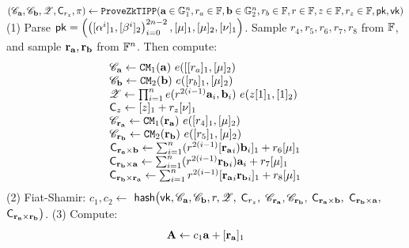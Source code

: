 \def\hp{\hspace*{0.1in}}
\begin{small}
\begin{algorithm}[bt]
$ (\GCommit_\myvec{a}, \GCommit_\myvec{b}, \Z, \Commit_{r_z}, \prf) 
	\leftarrow \newline
	\zktippprove(\myvec{a} \in \G_1^n, r_a \in \F, \myvec{b} \in \G_2^n, 
		r_b \in \F, r \in \F, z \in \F, r_z \in \F, \pk, \vk)$
\newline
(1) Parse $\mathsf{pk} = \left(\left([\alpha^i]_1, [\beta^i]_2\right)_{i=0}^{2n-2},
	[\mu]_1, [\mu]_2, [\nu]_1\right)$. 
Sample $r_4, r_5, r_6, r_7, r_8$ from $\mathbb{F}$, 
and sample ${{\mathbf {r_a}}}, {{\mathbf {r_b}}}$ from $\mathbb{F}^n$. Then compute:
\[
\begin{array} {l}
\GCommit_\myvec{a} \leftarrow \gcm_1(\myvec{a})~ e([[r_a]_1, [\mu]_2) \\
\GCommit_\myvec{b} \leftarrow \gcm_2(\myvec{b})~ e([r_b]_1, [\mu]_2) \\
\Z \leftarrow \prod_{i=1}^n e(r^{2(i-1)} \myvec{a}_i, \myvec{b}_i)
~ e(z [1]_1, [1]_2) \\
\Commit_{z} \leftarrow [z]_1 + r_z[\nu]_1 \\
\GCommit_\myvec{r_a} \leftarrow \gcm_1(\myvec{r_a})~ e([r_4]_1, [\mu]_2) \\
\GCommit_\myvec{r_b} \leftarrow \gcm_2(\myvec{r_b})~ e([r_5]_1, [\mu]_2)\\
\newline
\Commit_\myvec{r_a\times b} \leftarrow 
\sum_{i=1}^n (r^{2(i-1)} [\myvec{r_a}_i) \myvec{b}_i]_1 + 
  r_6[\mu]_1 \\
\Commit_\myvec{r_b\times a} \leftarrow 
\sum_{i=1}^n (r^{2(i-1)} \myvec{r_b}_i) \myvec{a}_i + 
  r_7 [\mu]_1 \\
\Commit_\myvec{r_b\times r_a} \leftarrow 
\sum_{i=1}^n r^{2(i-1)}[\myvec{r_a}_i \myvec{r_b}_i]_1
 + r_8 [\mu]_1
\end{array}
\]
 (2) Fiat-Shamir: $c_1, c_2 \leftarrow$
 	$\mathsf{hash}\big(\mathsf{vk},{\mathscr{C}}_{{\mathbf {a}}}, {\mathscr{C}}_{{\mathbf {b}}}, r, {\mathscr{Z}},$
		${\mathsf{C}}_{r_z}, $
		${\mathscr{C}}_{{\mathbf {r_a}}}, {\mathscr{C}}_{{\mathbf {r_b}}},$
		${\mathsf{C}}_{{\mathbf {r_a\times b}}},$
		${\mathsf{C}}_{{\mathbf {r_b\times a}}},$
		${\mathsf{C}}_{{\mathbf {r_a\times r_b}}}\big)$. \newline
 (3) Compute: \newline
	\[
		\begin{array}{l}
 {{\mathbf {A}}} \leftarrow c_1 {{\mathbf {a}}} + [{{\mathbf {r_a}}}]_1  \\

\end{array}\]
\end{algorithm}
\end{small}

